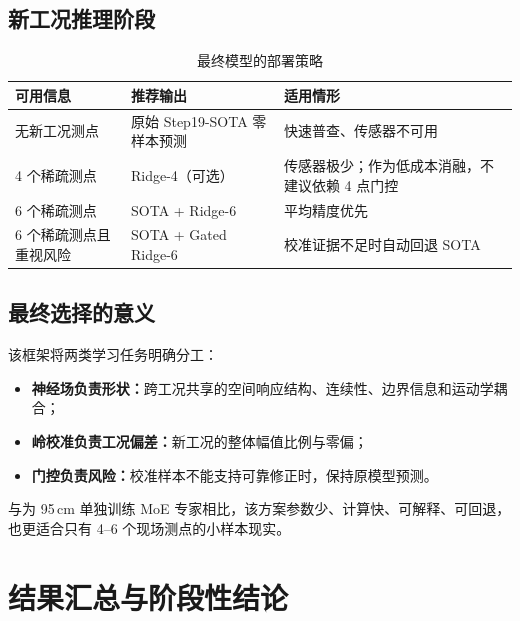 \documentclass[11pt,a4paper]{article}
\begin{document}
\subsection{新工况推理阶段}

\begin{table}[H]
\centering
\caption{最终模型的部署策略}
\begin{tabularx}{\textwidth}{C{31mm} Y Y}
\toprule
可用信息 & 推荐输出 & 适用情形\\
\midrule
无新工况测点 & 原始 Step19-SOTA 零样本预测 & 快速普查、传感器不可用\\
4 个稀疏测点 & Ridge-4（可选） & 传感器极少；作为低成本消融，不建议依赖 4 点门控\\
6 个稀疏测点 & SOTA + Ridge-6 & 平均精度优先\\
6 个稀疏测点且重视风险 & SOTA + Gated Ridge-6 & 校准证据不足时自动回退 SOTA\\
\bottomrule
\end{tabularx}
\end{table}

\subsection{最终选择的意义}

该框架将两类学习任务明确分工：

\begin{itemize}
  \item \textbf{神经场负责形状：}跨工况共享的空间响应结构、连续性、边界信息和运动学耦合；
  \item \textbf{岭校准负责工况偏差：}新工况的整体幅值比例与零偏；
  \item \textbf{门控负责风险：}校准样本不能支持可靠修正时，保持原模型预测。
\end{itemize}

与为 95\,cm 单独训练 MoE 专家相比，该方案参数少、计算快、可解释、可回退，也更适合只有 4--6 个现场测点的小样本现实。

\section{结果汇总与阶段性结论}
\end{document}
